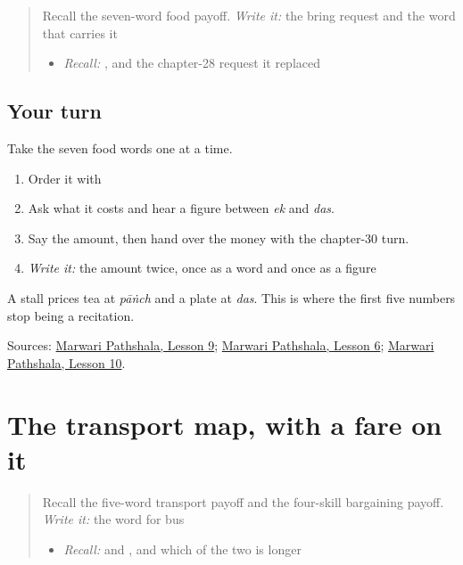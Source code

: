 \label{lesson:MW-R36-food-numbered}



\begin{quote}
Recall the seven-word food payoff. \emph{Write it:} the bring request and the word that carries it

\begin{itemize}
\raggedright
  \item \emph{Recall:} \textbf{ }, and the chapter-28 request it replaced
\end{itemize}
\end{quote}

\subsection*{Your turn}
Take the seven food words one at a time.

\begin{enumerate}
\raggedright
  \item Order it with \textbf{}
  \item Ask what it costs and hear a figure between \emph{ek} and \emph{das}.
  \item Say the amount, then hand over the money with the chapter-30 turn.
  \item \emph{Write it:} the amount twice, once as a word and once as a figure
\end{enumerate}

A stall prices tea at \emph{pāṅch} and a plate at \emph{das}. This is where the first five numbers stop being a recitation.

\begin{tcolorbox}[breakable,colback=teal!4,colframe=teal!35!black,title={Before you move on}]
Sources: \href{https://www.marwaripathshala.com/marwari-lesson-9-english}{Marwari Pathshala, Lesson 9}; \href{https://www.marwaripathshala.com/marwari-lesson-6-english}{Marwari Pathshala, Lesson 6}; \href{https://www.marwaripathshala.com/marwari-lesson-10-english}{Marwari Pathshala, Lesson 10}.
\end{tcolorbox}
\section[Practice]{The transport map, with a fare on it}

\label{lesson:MW-R36-transport-numbered}



\begin{quote}
Recall the five-word transport payoff and the four-skill bargaining payoff. \emph{Write it:} the word for bus

\begin{itemize}
\raggedright
  \item \emph{Recall:} \textbf{} and \textbf{}, and which of the two is longer
\end{itemize}
\end{quote}

